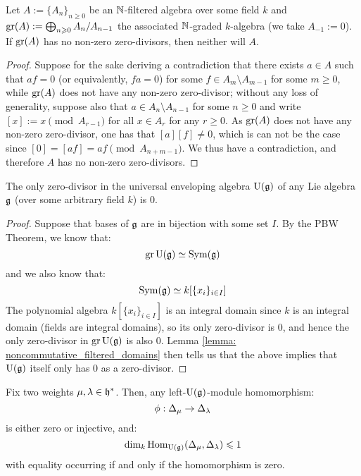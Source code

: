         \begin{lemma} \label{lemma: noncommutative_filtered_domains}
            \cite[Exercise I.9.4, pp. 20]{kassel_quantum_groups} Let $A := \{A_n\}_{n \geq 0}$ be an $\mathbb{N}$-filtered algebra over some field $k$ and $\operatorname{gr}(A) := \bigoplus_{n \geqslant 0} A_n/A_{n - 1}$ the associated $\mathbb{N}$-graded $k$-algebra (we take $A_{-1} := 0$). If $\operatorname{gr}(A)$ has no non-zero zero-divisors, then neither will $A$. 
        \end{lemma}
            \begin{proof}
                Suppose for the sake deriving a contradiction that there exists $a \in A$ such that $af = 0$ (or equivalently, $fa = 0$) for some $f \in A_m \setminus A_{m - 1}$ for some $m \geq 0$, while $\operatorname{gr}(A)$ does not have any non-zero zero-divisor; without any loss of generality, suppose also that $a \in A_n \setminus A_{n - 1}$ for some $n \geq 0$ and write $[x] := x \pmod{A_{r - 1}}$ for all $x \in A_r$ for any $r \geq 0$. As $\operatorname{gr}(A)$ does not have any non-zero zero-divisor, one has that $[a] [f]\not = 0$, which is can not be the case since $[0] = [af] = af \pmod{A_{n + m - 1}}$. We thus have a contradiction, and therefore $A$ has no non-zero zero-divisors. 
            \end{proof}
        \begin{corollary} \label{coro: universal_enveloping_algebras_are_noncommutative_domains}
            The only zero-divisor in the universal enveloping algebra $\mathrm{U}(\mathfrak{g})$ of any Lie algebra $\mathfrak{g}$ (over some arbitrary field $k$) is $0$.
        \end{corollary}
            \begin{proof}
                Suppose that bases of $\mathfrak{g}$ are in bijection with some set $I$. By the PBW Theorem, we know that:
                    $$\operatorname{gr} \mathrm{U}(\mathfrak{g}) \simeq \mathrm{Sym}(\mathfrak{g})$$
                and we also know that:
                    $$\mathrm{Sym}(\mathfrak{g}) \simeq k[\{x_i\}_{i \in I}]$$
                The polynomial algebra $k[\{x_i\}_{i \in I}]$ is an integral domain since $k$ is an integral domain (fields are integral domains), so its only zero-divisor is $0$, and hence the only zero-divisor in $\operatorname{gr} \mathrm{U}(\mathfrak{g})$ is also $0$. Lemma \ref{lemma: noncommutative_filtered_domains} then tells us that the above implies that $\mathrm{U}(\mathfrak{g})$ itself only has $0$ as a zero-divisor.
            \end{proof}
        \begin{proposition} \label{prop: homomorphisms_between_verma_modules_are_zero_or_injective}
            Fix two weights $\mu, \lambda \in \mathfrak{h}^*$. Then, any left-$\mathrm{U}(\mathfrak{g})$-module homomorphism:
                $$\phi: \Delta_{\mu} \to \Delta_{\lambda}$$
            is either zero or injective, and:
                $$\dim_k \mathrm{Hom}_{\mathrm{U}(\mathfrak{g})}(\Delta_{\mu}, \Delta_{\lambda}) \leqslant 1$$
            with equality occurring if and only if the homomorphism is zero. 
        \end{proposition}
